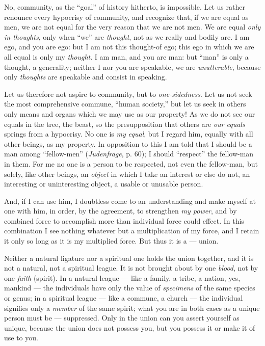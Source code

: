 No, community, as the ``goal'' of history hitherto, is impossible. Let us 
rather renounce every hypocrisy of community, and recognize that, if we are 
equal as men, we are not equal for the very reason that we are not men. We are 
equal \textit{only in thoughts}, only when ``we'' are \textit{thought}, not 
as we really and bodily are. I am ego, and you are ego: but I am not this 
thought-of ego; this ego in which we are all equal is only my 
\textit{thought}. I am man, and you are man: but ``man'' is only a thought, 
a generality; neither I nor you are speakable, we are \textit{unutterable}, 
because only \textit{thoughts} are speakable and consist in speaking.

Let us therefore not aspire to community, but to \textit{one-sidedness}. Let 
us not seek the most comprehensive commune, ``human society,'' but let us 
seek in others only means and organs which we may use as our property! As we 
do not see our equals in the tree, the beast, so the presupposition that 
others are \textit{our equals} springs from a hypocrisy. No one is \textit{my 
equal}, but I regard him, equally with all other beings, as my property. In 
opposition to this I am told that I should be a man among ``fellow-men'' 
(\textit{Judenfrage}, p. 60); I should ``respect'' the fellow-man in them. 
For me no one is a person to be respected, not even the fellow-man, but 
solely, like other beings, an \textit{object} in which I take an interest or 
else do not, an interesting or uninteresting object, a usable or unusable 
person.

And, if I can use him, I doubtless come to an understanding and make myself at 
one with him, in order, by the agreement, to strengthen \textit{my power}, and 
by combined force to accomplish more than individual force could effect. In 
this combination I see nothing whatever but a multiplication of my force, and 
I retain it only so long as it is my multiplied force. But thus it is a --- union.

Neither a natural ligature nor a spiritual one holds the union together, and 
it is not a natural, not a spiritual league. It is not brought about by one 
\textit{blood}, not by one \textit{faith} (spirit). In a natural league --- like a family, a tribe, a nation, yes, mankind --- the individuals have only 
the value of \textit{specimens} of the same species or genus; in a spiritual 
league --- like a commune, a church --- the individual signifies only a 
\textit{member} of the same spirit; what you are in both cases as a unique 
person must be --- suppressed. Only in the union can you assert yourself as 
unique, because the union does not possess you, but you possess it or make it 
of use to you.

